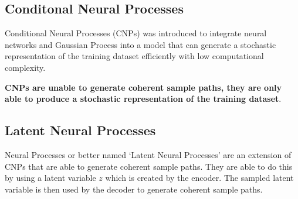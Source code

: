 \documentclass[main.tex]{subfiles}
\begin{document}
\subsection{Conditonal Neural Processes}

Conditional Neural Processes (CNPs) \cite{garnelo2018conditional} was introduced to integrate neural networks and Gaussian Process into a model that can generate a stochastic representation of the training dataset efficiently with low computational complexity. 

\textbf{CNPs are unable to generate coherent sample paths, they are only able to produce a stochastic representation of the training dataset}. 

\subsection{Latent Neural Processes}

Neural Processes or better named `Latent Neural Processes' are an extension of CNPs that are able to generate coherent sample paths. They are able to do this by using a latent variable $z$ which is created by the encoder. The sampled latent variable is then used by the decoder to generate coherent sample paths.


\ifSubfilesClassLoaded{%
    \printbibliography{}
}{} 
\end{document}
